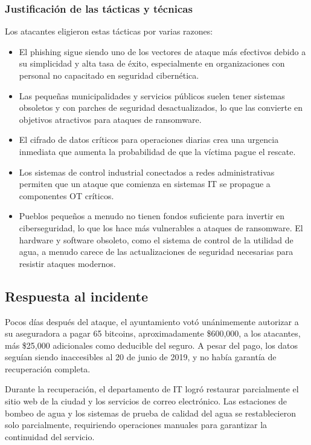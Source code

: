\subsubsection{Justificación de las tácticas y técnicas}
Los atacantes eligieron estas tácticas por varias razones:

\begin{itemize}
    \item El phishing sigue siendo uno de los vectores de ataque más efectivos debido a su simplicidad y alta tasa de éxito, especialmente en organizaciones con personal no capacitado en seguridad cibernética.
    
    \item Las pequeñas municipalidades y servicios públicos suelen tener sistemas obsoletos y con parches de seguridad desactualizados, lo que las convierte en objetivos atractivos para ataques de ransomware.
    
    \item El cifrado de datos críticos para operaciones diarias crea una urgencia inmediata que aumenta la probabilidad de que la víctima pague el rescate.
    
    \item Los sistemas de control industrial conectados a redes administrativas permiten que un ataque que comienza en sistemas IT se propague a componentes OT críticos.
    
    \item Pueblos pequeños a menudo no tienen fondos suficiente para invertir en ciberseguridad, lo que los hace más vulnerables a ataques de ransomware.
    El hardware y software obsoleto, como el sistema de control de la utilidad de agua, a menudo carece de las actualizaciones de seguridad necesarias para resistir ataques modernos.
\end{itemize}

\subsection{Respuesta al incidente}
Pocos días después del ataque, el ayuntamiento votó unánimemente autorizar a su aseguradora a pagar 65 bitcoins, aproximadamente \$600,000, a los atacantes, más \$25,000 adicionales como deducible del seguro. A pesar del pago, los datos seguían siendo inaccesibles al 20 de junio de 2019, y no había garantía de recuperación completa.

Durante la recuperación, el departamento de IT logró restaurar parcialmente el sitio web de la ciudad y los servicios de correo electrónico. Las estaciones de bombeo de agua y los sistemas de prueba de calidad del agua se restablecieron solo parcialmente, requiriendo operaciones manuales para garantizar la continuidad del servicio.

